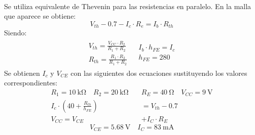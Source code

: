 \paragraph{}
Se utiliza equivalente de Thevenin para las resistencias en paralelo. En la malla que aparece se obtiene:
$$V_{th} - 0.7 - I_c \cdot R_e = I_b \cdot R_{th}$$
Siendo:
\renewcommand{\arraystretch}{1.5}
\[
\begin{array}{rl} 
      \begin{array}{l}
	 V_{th} = \frac{V_{CC} \cdot R_2}{R_1+R_2} \\
	 R_{th} = \frac{R_1 \cdot R_2}{R_1+R_2}
      \end{array}
      &
      \begin{array}{l}
	 I_b \cdot h_{FE}= I_c \\
	 h_{FE} = 280
      \end{array}
\end{array}
\]
Se obtienen $I_c$ y $V_{CE}$ con las siguientes dos ecuaciones sustituyendo los valores correspondientes:
\begin{align*}
   R_1=\SI{10}{\kilo\ohm} \quad R_2=\SI{20}{\kilo\ohm} \quad &R_E=\SI{40}{\ohm} \quad V_{CC} = \SI{9}{\volt} \\
   I_c \cdot \left( 40+ \frac{R_{th}}{h_{FE}}\right) &= V_{th} - 0.7 \\
   V_{CC} = V_{CE} &+ I_C \cdot R_E
\end{align*}
\begin{equation}
   V_{CE}= \SI{5.68}{\volt} \quad I_C = \SI{83}{\milli\ampere}
\end{equation}
